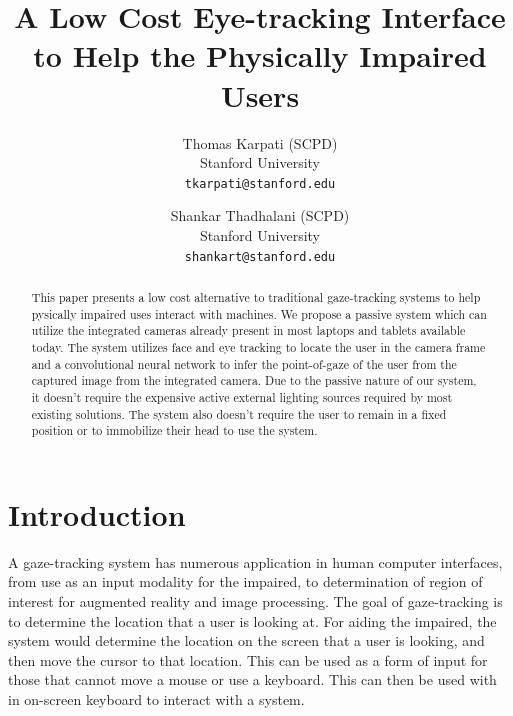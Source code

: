 \documentclass[10pt,twocolumn,letterpaper]{article}
\begin{document}
\title{A Low Cost Eye-tracking Interface to Help the Physically
  Impaired Users}

\author{Thomas Karpati (SCPD)\\
Stanford University \\
{\tt\small tkarpati@stanford.edu}
\and
Shankar Thadhalani (SCPD)\\
Stanford University \\
{\tt\small shankart@stanford.edu}
}

\maketitle

\begin{abstract}
This paper presents a low cost alternative to traditional
gaze-tracking systems to help pysically impaired uses interact with
machines. We propose a passive system which can utilize the integrated
cameras already present in most laptops and tablets available
today. The system utilizes face and eye tracking to locate the user in
the camera frame and a convolutional neural network to infer the
point-of-gaze of the user from the captured image from the integrated
camera. Due to the passive nature of our system, it doesn't require
the expensive active external lighting sources required by most
existing solutions. The system also doesn't require the user to remain
in a fixed position or to immobilize their head to use the system.
\end{abstract}

\section{Introduction}
A gaze-tracking system has numerous application in human computer
interfaces, from use as an input modality for the impaired\cite{calvo}, to
determination of region of interest for augmented reality and image
processing. The goal of gaze-tracking is to determine the location
that a user is looking at. For aiding the impaired, the system would
determine the location on the screen that a user is looking, and then
move the cursor to that location. This can be used as a form of input
for those that cannot move a mouse or use a keyboard. This
can then be used with in on-screen keyboard to interact with a
system.
\end{document}
